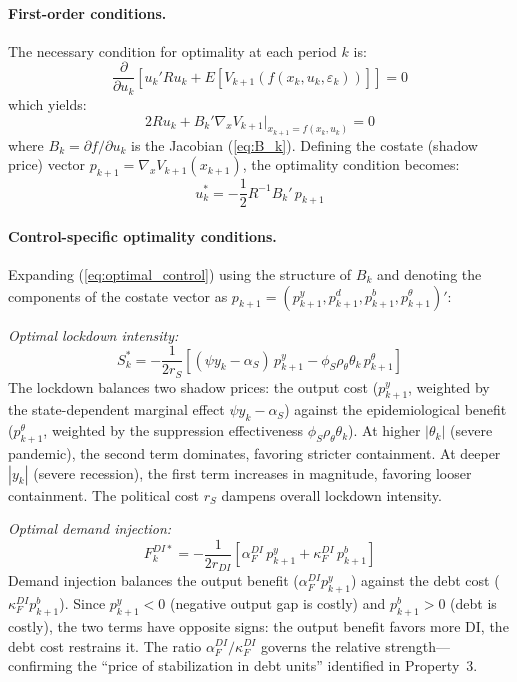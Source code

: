 \documentclass[12pt, a4paper]{article}
\begin{document}
\paragraph{First-order conditions.} The necessary condition for optimality at each period $k$ is:
%
\begin{equation}
    \frac{\partial}{\partial u_k}\left[u_k' R u_k + E\left[V_{k+1}(f(x_k, u_k, \varepsilon_k))\right]\right] = 0
    \label{eq:foc_general}
\end{equation}
%
which yields:
%
\begin{equation}
    2 R u_k + B_k' \nabla_x V_{k+1}\big|_{x_{k+1} = f(x_k, u_k)} = 0
    \label{eq:foc}
\end{equation}
%
where $B_k = \partial f / \partial u_k$ is the Jacobian (\ref{eq:B_k}). Defining the costate (shadow price) vector $p_{k+1} = \nabla_x V_{k+1}(x_{k+1})$, the optimality condition becomes:
%
\begin{equation}
    u_k^* = -\frac{1}{2} R^{-1} B_k' \, p_{k+1}
    \label{eq:optimal_control}
\end{equation}

\paragraph{Control-specific optimality conditions.} Expanding (\ref{eq:optimal_control}) using the structure of $B_k$ and denoting the components of the costate vector as $p_{k+1} = (p_{k+1}^y, p_{k+1}^d, p_{k+1}^b, p_{k+1}^\theta)'$:

\medskip
\noindent\textit{Optimal lockdown intensity:}
%
\begin{equation}
    S_k^* = -\frac{1}{2 r_S}\left[
      (\psi y_k - \alpha_S) \, p_{k+1}^y
      - \phi_S \rho_\theta \theta_k \, p_{k+1}^\theta
    \right]
    \label{eq:opt_S}
\end{equation}
%
The lockdown balances two shadow prices: the output cost ($p_{k+1}^y$, weighted by the state-dependent marginal effect $\psi y_k - \alpha_S$) against the epidemiological benefit ($p_{k+1}^\theta$, weighted by the suppression effectiveness $\phi_S \rho_\theta \theta_k$). At higher $|\theta_k|$ (severe pandemic), the second term dominates, favoring stricter containment. At deeper $|y_k|$ (severe recession), the first term increases in magnitude, favoring looser containment. The political cost $r_S$ dampens overall lockdown intensity.

\medskip
\noindent\textit{Optimal demand injection:}
%
\begin{equation}
    F_k^{DI*} = -\frac{1}{2 r_{DI}}\left[
      \alpha_F^{DI} \, p_{k+1}^y
      + \kappa_F^{DI} \, p_{k+1}^b
    \right]
    \label{eq:opt_DI}
\end{equation}
%
Demand injection balances the output benefit ($\alpha_F^{DI} p_{k+1}^y$) against the debt cost ($\kappa_F^{DI} p_{k+1}^b$). Since $p_{k+1}^y < 0$ (negative output gap is costly) and $p_{k+1}^b > 0$ (debt is costly), the two terms have opposite signs: the output benefit favors more DI, the debt cost restrains it. The ratio $\alpha_F^{DI} / \kappa_F^{DI}$ governs the relative strength---confirming the ``price of stabilization in debt units'' identified in Property~3.
\end{document}
